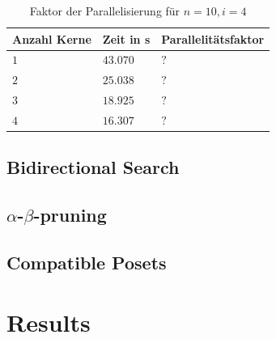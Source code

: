 \documentclass[10pt,journal,compsoc]{IEEEtran}
\begin{document}
\begin{table}
  \begin{tabular}{l|l|l}
    Anzahl Kerne & Zeit in s & Parallelitätsfaktor \\
    \hline
    $1$          & $43.070$  & $?$                 \\ %
    $2$          & $25.038$  & $?$                 \\
    $3$          & $18.925$  & $?$                 \\
    $4$          & $16.307$  & $?$                 \\
  \end{tabular}
  \centering
  \caption{Faktor der Parallelisierung für $n = 10, i = 4$}
  \label{table:backward-parallel}
\end{table}


\subsection{Bidirectional Search}

\subsection{$\alpha$-$\beta$-pruning}

\subsection{Compatible Posets}

\section{Results}
\end{document}
